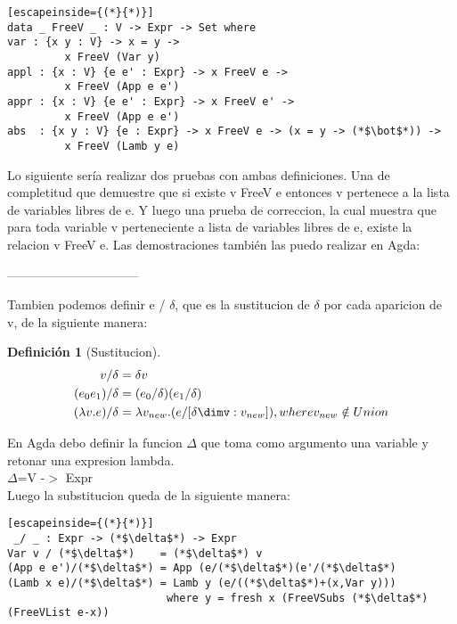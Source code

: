 \documentclass{book}
\newtheorem{definition}{Definición}
\begin{document}
\begin{lstlisting}[escapeinside={(*}{*)}]
data _ FreeV _ : V -> Expr -> Set where
var : {x y : V} -> x = y ->
         x FreeV (Var y)
appl : {x : V} {e e' : Expr} -> x FreeV e ->
         x FreeV (App e e')
appr : {x : V} {e e' : Expr} -> x FreeV e' ->
         x FreeV (App e e')
abs  : {x y : V} {e : Expr} -> x FreeV e -> (x = y -> (*$\bot$*)) ->
         x FreeV (Lamb y e)
\end{lstlisting}
      

Lo siguiente sería realizar dos pruebas con ambas definiciones. Una de completitud que demuestre que si existe v FreeV e entonces v pertenece a la lista de variables libres de e. Y luego una prueba de correccion, la cual muestra que para toda variable v perteneciente a lista de variables libres de e, existe la relacion v FreeV e.
Las demostraciones también las puedo realizar en Agda:







                             

--------------------------------
                             





Tambien podemos definir e / $\delta$, que es la sustitucion de $\delta$ por cada aparicion de v, de la siguiente manera:

\begin{definition}[Sustitucion]
  \begin{align*}\label{eq:1}
    v / \delta &= \delta v \\
    (e_{0}e_{1})/\delta &= (e_{0}/\delta)(e_{1}/\delta) \\
    (\lambda v.e)/\delta &= \lambda v_{new}.(e/[\delta\dimv:v_{new}]), where  v_{new} \notin Union 
  \end{align*}
\end{definition}

En Agda debo definir la funcion $\Delta$ que toma como argumento una variable y retonar una expresion lambda.
\\
$\Delta$=V -$>$ Expr
\\

Luego la substitucion queda de la siguiente manera:\\

\begin{lstlisting}[escapeinside={(*}{*)}]
 _/ _ : Expr -> (*$\delta$*) -> Expr
Var v / (*$\delta$*)    = (*$\delta$*) v
(App e e')/(*$\delta$*) = App (e/(*$\delta$*)(e'/(*$\delta$*)
(Lamb x e)/(*$\delta$*) = Lamb y (e/((*$\delta$*)+(x,Var y)))
                         where y = fresh x (FreeVSubs (*$\delta$*) (FreeVList e-x))
\end{lstlisting}
 
\end{document}
